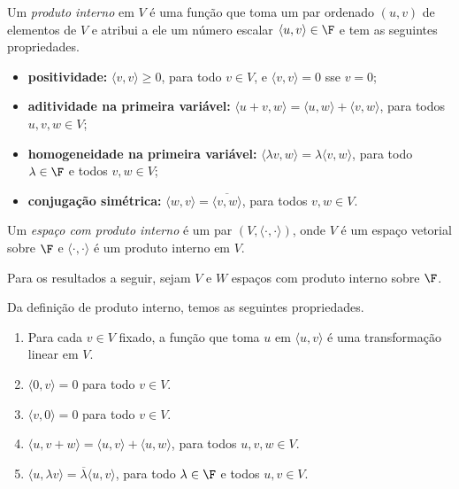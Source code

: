 \documentclass{article}
\begin{document}
\begin{defn}
    Um \emph{produto interno} em \(V\) é uma função que toma um par ordenado \((u, v)\) de elementos de \(V\) e atribui a ele um número escalar \(\langle u, v \rangle \in \F\) e tem as seguintes propriedades.
    \begin{itemize}
        \item \textbf{positividade:} \(\langle v, v \rangle \geq 0\), para todo \(v \in V\), e \(\langle v, v \rangle = 0\) sse \(v = 0\);
        \item \textbf{aditividade na primeira variável:} \(\langle u + v, w \rangle = \langle u, w \rangle + \langle v, w \rangle\), para todos \(u, v, w \in V\);
        \item \textbf{homogeneidade na primeira variável:} \(\langle \lambda v, w \rangle = \lambda \langle v, w \rangle\), para todo \(\lambda \in \F\) e todos \(v, w \in V\);
        \item \textbf{conjugação simétrica:} \(\langle w, v \rangle = \overline{\langle v, w \rangle}\), para todos \(v, w \in V\).
    \end{itemize}
\end{defn}

\begin{defn}
    Um \emph{espaço com produto interno} é um par \((V, \langle \cdot, \cdot \rangle)\), onde \(V\) é um espaço vetorial sobre \(\F\) e \(\langle \cdot, \cdot \rangle\) é um produto interno em \(V\).
\end{defn}

Para os resultados a seguir, sejam \(V\) e \(W\) espaços com produto interno sobre \(\F\).

\begin{prop}  Da definição de produto interno, temos as seguintes propriedades.
    \begin{enumerate}
        \item [(a)] Para cada \(v \in V\) fixado, a função que toma \(u\) em \(\langle u, v \rangle\) é uma transformação linear em \(V\).
        \item [(b)] \(\langle 0, v \rangle = 0\) para todo \(v \in V\).
        \item [(c)] \(\langle v, 0 \rangle = 0\) para todo \(v \in V\).
        \item [(d)] \(\langle u, v + w \rangle = \langle u, v \rangle + \langle u, w \rangle\), para todos \(u, v, w \in V\).
        \item [(e)] \(\langle u, \lambda v \rangle = \overline{\lambda} \langle u, v \rangle\), para todo \(\lambda \in \F\) e todos \(u, v \in V\).
    \end{enumerate}
\end{prop}
\end{document}
